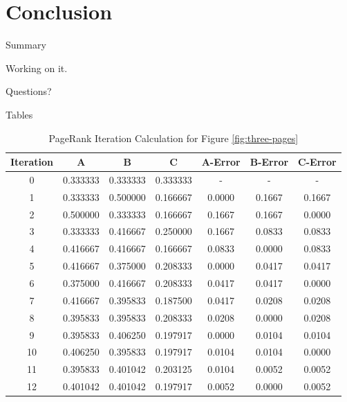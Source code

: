 \documentclass[10pt]{beamer}
\begin{document}
\section{Conclusion}

\begin{frame}{Summary}
\begin{center}Working on it.\end{center}
\end{frame}

\begin{frame}[standout]
  Questions?
\end{frame}

\appendix
\begin{frame}[fragile]{Tables}
\begin{table}
\begin{center}
\tiny
\caption{PageRank Iteration Calculation for Figure \ref{fig:three-pages}}\label{tab:pr-calculation}
\begin{tabular}{c c c c c c c}
\toprule
Iteration & A &	B & C & A-Error & B-Error & C-Error\\
\midrule
0 & 0.333333 & 0.333333 & 0.333333 & - & - & -\\
1 & 0.333333 & 0.500000 & 0.166667 & 0.0000 & 0.1667 & 0.1667\\
2 & 0.500000 & 0.333333 & 0.166667 & 0.1667 & 0.1667 & 0.0000\\
3 & 0.333333 & 0.416667 & 0.250000 & 0.1667 & 0.0833 & 0.0833\\
4 & 0.416667 & 0.416667 & 0.166667 & 0.0833 & 0.0000 & 0.0833\\
5 & 0.416667 & 0.375000 & 0.208333 & 0.0000 & 0.0417 & 0.0417\\
6 & 0.375000 & 0.416667 & 0.208333 & 0.0417 & 0.0417 & 0.0000\\
7 & 0.416667 & 0.395833 & 0.187500 & 0.0417 & 0.0208 & 0.0208\\
8 & 0.395833 & 0.395833 & 0.208333 & 0.0208 & 0.0000 & 0.0208\\
9 & 0.395833 & 0.406250 & 0.197917 & 0.0000 & 0.0104 & 0.0104\\
10 & 0.406250 & 0.395833 & 0.197917 & 0.0104 & 0.0104 & 0.0000\\
11 & 0.395833 & 0.401042 & 0.203125 & 0.0104 & 0.0052 & 0.0052\\
12 & 0.401042 & 0.401042 & 0.197917 & 0.0052 & 0.0000 & 0.0052\\

\end{tabular}
\end{center}
\end{table}
\end{frame}
\end{document}
